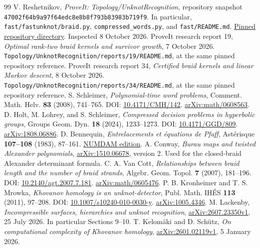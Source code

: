 \documentclass[11pt,letterpaper]{article}
\theoremstyle{definition}\newtheorem{definition}[theorem]{Definition}
\theoremstyle{remark}\newtheorem{remark}[theorem]{Remark}
\newcommand{\sha}{\texttt{47002f64b9a97f64edc8e8b8f793b83983b719f9}}
\begin{document}
\begin{thebibliography}{99}
 V. Reshetnikov, \emph{ProveIt: Topology/UnknotRecognition}, repository snapshot \sha. In particular, \texttt{fast/fastunknot/braid.py}, \texttt{compressed\_words.py}, and \texttt{fast/README.md}. \href{https://github.com/VladimirReshetnikov/ProveIt/tree/47002f64b9a97f64edc8e8b8f793b83983b719f9/Topology/UnknotRecognition}{Pinned repository directory}. Inspected 8 October 2026.
 ProveIt research report 19, \emph{Optimal rank-two braid kernels and survivor growth}, 7 October 2026. \texttt{Topology/UnknotRecognition/reports/19/README.md}, at the same pinned repository reference.
 ProveIt research report 34, \emph{Certified braid kernels and linear Markov descent}, 8 October 2026. \texttt{Topology/UnknotRecognition/reports/34/README.md}, at the same pinned repository reference.
 S. Schleimer, \emph{Polynomial-time word problems}, Comment. Math. Helv. \textbf{83} (2008), 741--765. DOI: \href{https://doi.org/10.4171/CMH/142}{10.4171/CMH/142}. \href{https://arxiv.org/abs/math/0608563}{arXiv:math/0608563}.
 D. Holt, M. Lohrey, and S. Schleimer, \emph{Compressed decision problems in hyperbolic groups}, Groups Geom. Dyn. \textbf{18} (2024), 1233--1273. DOI: \href{https://doi.org/10.4171/GGD/809}{10.4171/GGD/809}. \href{https://arxiv.org/abs/1808.06886}{arXiv:1808.06886}.
 D. Bennequin, \emph{Entrelacements et \'equations de Pfaff}, Ast\'erisque \textbf{107--108} (1983), 87--161. \href{https://www.numdam.org/item/AST_1983__107-108__87_0/}{NUMDAM edition}.
 A. Conway, \emph{Burau maps and twisted Alexander polynomials}, \href{https://arxiv.org/abs/1510.06678}{arXiv:1510.06678}, version 2. Used for the closed-braid Alexander determinant formula.
 C. A. Van Cott, \emph{Relationships between braid length and the number of braid strands}, Algebr. Geom. Topol. \textbf{7} (2007), 181--196. DOI: \href{https://doi.org/10.2140/agt.2007.7.181}{10.2140/agt.2007.7.181}. \href{https://arxiv.org/abs/math/0605476}{arXiv:math/0605476}.
 P. B. Kronheimer and T. S. Mrowka, \emph{Khovanov homology is an unknot-detector}, Publ. Math. IH\'ES \textbf{113} (2011), 97--208. DOI: \href{https://doi.org/10.1007/s10240-010-0030-y}{10.1007/s10240-010-0030-y}. \href{https://arxiv.org/abs/1005.4346}{arXiv:1005.4346}.
 M. Lackenby, \emph{Incompressible surfaces, hierarchies and unknot recognition}, \href{https://arxiv.org/html/2607.23350v1}{arXiv:2607.23350v1}, 25 July 2026. In particular Sections 9--10.
 T. Kelom\"aki and D. Sch\"utz, \emph{On computational complexity of Khovanov homology}, \href{https://arxiv.org/html/2601.02119v1}{arXiv:2601.02119v1}, 5 January 2026.
\end{thebibliography}
\end{document}
